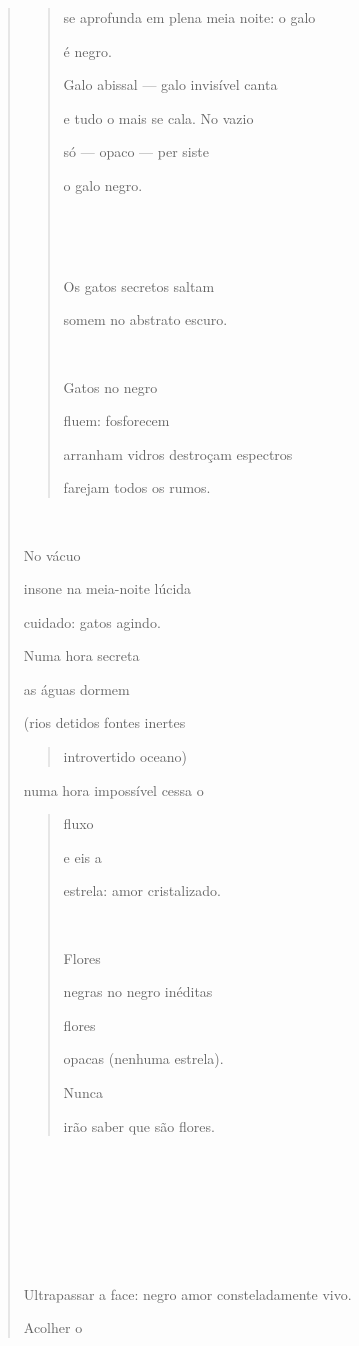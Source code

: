 \begin{verse}
\begin{quote}
se aprofunda em plena meia noite: o galo

é negro.

Galo abissal --- galo invisível canta

e tudo o mais se cala. No vazio

só --- opaco --- per siste

o galo negro.





Os gatos secretos saltam

somem no abstrato escuro.



Gatos no negro

fluem: fosforecem

arranham vidros destroçam espectros

farejam todos os rumos.
\end{quote}



No vácuo

insone na meia-noite lúcida

cuidado: gatos agindo.

Numa hora secreta

as águas dormem

(rios detidos fontes inertes

\begin{quote}
introvertido oceano)
\end{quote}

numa hora impossível cessa o

\begin{quote}
fluxo

e eis a

estrela: amor cristalizado.



Flores

negras no negro inéditas

flores

opacas (nenhuma estrela).

Nunca

irão saber que são flores.
\end{quote}









Ultrapassar a face: negro amor consteladamente vivo.

Acolher o


\end{verse}
